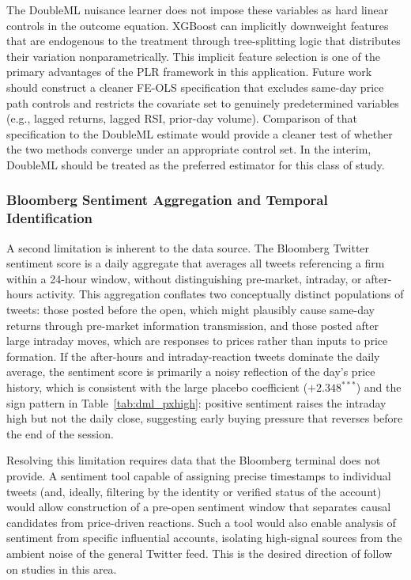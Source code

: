 The DoubleML nuisance learner does not impose these variables as hard linear
controls in the outcome equation. XGBoost can implicitly downweight features
that are endogenous to the treatment through tree-splitting logic that
distributes their variation nonparametrically. This implicit feature selection
is one of the primary advantages of the PLR framework in this application.
Future work should construct a cleaner FE-OLS specification that excludes
same-day price path controls and restricts the covariate set to genuinely
predetermined variables (e.g., lagged returns, lagged RSI, prior-day volume).
Comparison of that specification to the DoubleML estimate would provide a
cleaner test of whether the two methods converge under an appropriate control
set. In the interim, DoubleML should be treated as the preferred estimator for
this class of study.

\subsubsection{Bloomberg Sentiment Aggregation and Temporal Identification}

A second limitation is inherent to the data source. The Bloomberg Twitter
sentiment score is a daily aggregate that averages all tweets referencing a
firm within a 24-hour window, without distinguishing pre-market, intraday, or
after-hours activity. This aggregation conflates two conceptually distinct
populations of tweets: those posted before the open, which might plausibly
cause same-day returns through pre-market information transmission, and those
posted after large intraday moves, which are responses to prices rather than
inputs to price formation. If the after-hours and intraday-reaction tweets
dominate the daily average, the sentiment score is primarily a noisy
reflection of the day's price history, which is consistent with the large
placebo coefficient ($+2.348^{***}$) and the sign pattern in
Table~\ref{tab:dml_pxhigh}: positive sentiment raises the intraday high but
not the daily close, suggesting early buying pressure that reverses before the
end of the session.

Resolving this limitation requires data that the Bloomberg terminal does not
provide. A sentiment tool capable of assigning precise timestamps to individual
tweets (and, ideally, filtering by the identity or verified status of the
account) would allow construction of a pre-open sentiment window that
separates causal candidates from price-driven reactions. Such a tool would
also enable analysis of sentiment from specific influential accounts,
isolating high-signal sources from the ambient noise of the general Twitter
feed. This is the desired direction of follow on studies in this area.

